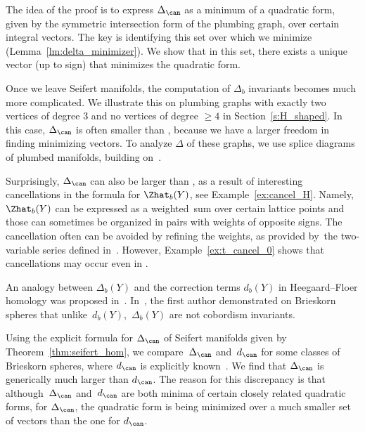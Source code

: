\documentclass[pdftex]{sigma}
\begin{document}
The idea of the proof is to express $\Delta_{\can}$ as a minimum of a quadratic form, given by the symmetric intersection form of the plumbing graph, over certain integral vectors. The key is identifying this set over which we minimize (Lemma~\ref{lm:delta_minimizer}). We show that in this set, there exists a unique vector (up to sign) that minimizes the quadratic form.

Once we leave Seifert manifolds, the computation of $\Delta_b$ invariants becomes much more complicated. We illustrate this on plumbing graphs with exactly two vertices of degree 3 and no vertices of degree $\geq 4$ in Section~\ref{s:H_shaped}. In this case, $\Delta_{\can}$ is often smaller than , because we have a larger freedom in finding minimizing vectors. To analyze $\Delta$ of these graphs, we use splice diagrams~\cite{NeumannWallBook86,NW05a, Sie80} of plumbed manifolds, building on~\cite{GKS23}.

Surprisingly, $\Delta_{\can}$ can also be larger than , as a result of interesting cancellations in the formula for $\Zhat_b(Y)$, see Example~\ref{ex:cancel_H}. Namely, $\Zhat_b(Y)$ can be expressed as a weighted~sum over certain lattice points and those can sometimes be organized in pairs with weights of opposite signs.
The cancellation often can be avoided by refining the weights, as provided by~the two-variable series  defined in~\cite{AJK23}. However, Example~\ref{ex:t_cancel_0} shows that cancellations may occur even in .

An analogy between $\Delta_b(Y)$ and the correction terms $d_b(Y)$ in Heegaard--Floer homology was proposed in~\cite{GPP21}. In~\cite{harichurn2023deltaa}, the first author demonstrated on Brieskorn spheres that unlike~$d_b(Y)$,~$\Delta_b(Y)$ are not cobordism invariants.

Using the explicit formula for $\Delta_{\can}$ of Seifert manifolds given by Theorem~\ref{thm:seifert_hom}, we compare~$\Delta_{\can}$ and~$d_{\can}$ for some classes of Brieskorn spheres, where $d_{\can}$ is explicitly known~\cite{BorNem2011}. We find that $\Delta_{\can}$ is generically much larger than $d_{\can}$. The reason for this discrepancy is that although~$\Delta_{\can}$ and~$d_{\can}$ are both minima of certain closely related quadratic forms, for $\Delta_{\can}$, the quadratic form is being minimized over a much smaller set of vectors than the one for $d_{\can}$.
\end{document}
